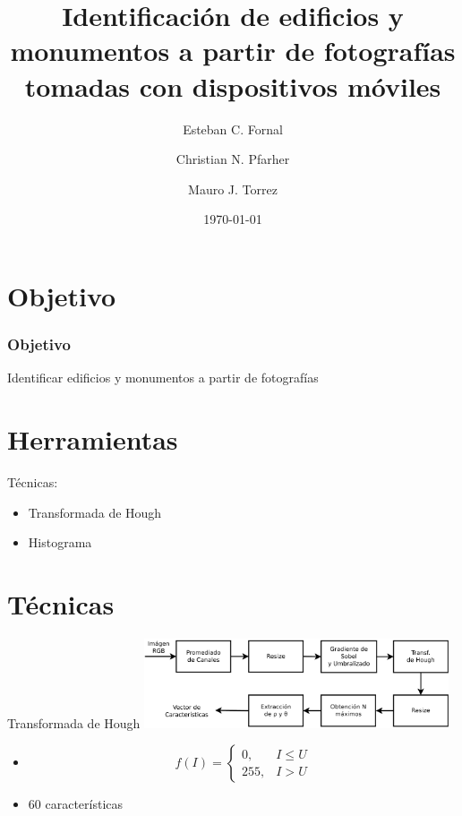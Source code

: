 \documentclass[spanish]{beamer}
\title{Identificación de edificios y monumentos a partir de fotografías tomadas 
con dispositivos móviles}
\author{Esteban C. Fornal \and Christian N. Pfarher \and Mauro J. Torrez}
\date{\today}
\begin{document}
%
\frame{\titlepage}

\section[Outline]{Objetivo}

\begin{frame}{}
\frametitle{Objetivo}
Identificar edificios y monumentos a partir de fotografías
\end{frame}

\section[Outline]{Herramientas}

\begin{frame}{Técnicas:}
\begin{itemize}
\item<1-> Transformada de Hough
\item<2-> Histograma
\end{itemize}
\end{frame}

\section[Outline]{Técnicas}

\begin{frame}{Transformada de Hough}
  \includegraphics[width=9cm]{../diagramas/procesohough}

  \begin{itemize}
  \item[]
    \begin{equation*}
      \label{umbral}
      f(I)=
      \begin{cases}
      0, & I\leq U\\
      255, & I > U
      \end{cases}
      \end{equation*}
  \item 60 características
  \end{itemize}
\end{frame}
\end{document}
